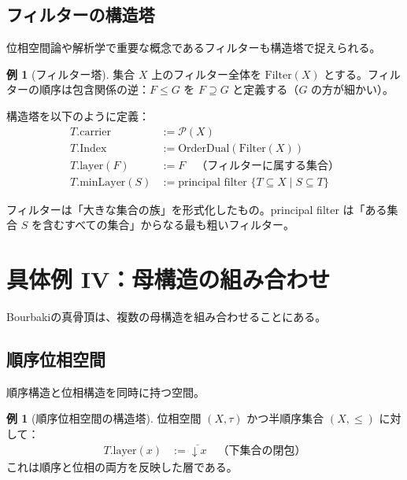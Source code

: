 \documentclass[a4paper,11pt,ja=standard]{bxjsarticle}
\theoremstyle{definition}
\newtheorem{example}[definition]{例}
\begin{document}
\subsection{フィルターの構造塔}

位相空間論や解析学で重要な概念であるフィルターも構造塔で捉えられる。

\begin{example}[フィルター塔]
集合 $X$ 上のフィルター全体を $\text{Filter}(X)$ とする。フィルターの順序は包含関係の逆：$F \leq G$ を $F \supseteq G$ と定義する（$G$ の方が細かい）。

構造塔を以下のように定義：
\begin{align*}
T.\text{carrier} &:= \mathcal{P}(X) \\
T.\text{Index} &:= \text{OrderDual}(\text{Filter}(X)) \\
T.\text{layer}(F) &:= F \quad \text{（フィルターに属する集合）} \\
T.\text{minLayer}(S) &:= \text{principal filter } \{T \subseteq X \mid S \subseteq T\}
\end{align*}
\end{example}

\begin{intuition}
フィルターは「大きな集合の族」を形式化したもの。principal filter は「ある集合 $S$ を含むすべての集合」からなる最も粗いフィルター。
\end{intuition}

\section{具体例 IV：母構造の組み合わせ}

Bourbakiの真骨頂は、複数の母構造を組み合わせることにある。

\subsection{順序位相空間}

順序構造と位相構造を同時に持つ空間。

\begin{example}[順序位相空間の構造塔]
位相空間 $(X, \tau)$ かつ半順序集合 $(X, \leq)$ に対して：
\begin{align*}
T.\text{layer}(x) &:= \overline{\downarrow\! x} \quad \text{（下集合の閉包）}
\end{align*}
これは順序と位相の両方を反映した層である。
\end{example}
\end{document}
